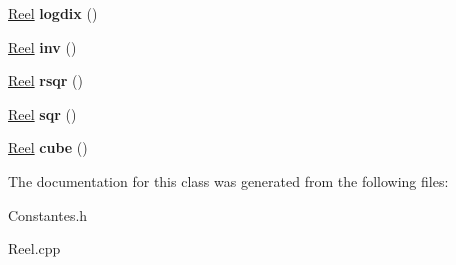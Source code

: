 \begin{DoxyCompactItemize}
\item 
\hypertarget{class_calcul_1_1_reel_ad0ce58a3af4dda52ef15463978220ab0}{\hyperlink{class_calcul_1_1_reel}{Reel} {\bfseries logdix} ()}\label{class_calcul_1_1_reel_ad0ce58a3af4dda52ef15463978220ab0}

\item 
\hypertarget{class_calcul_1_1_reel_ad7c91c30fd82bfd62748cf7c0b6f6e7b}{\hyperlink{class_calcul_1_1_reel}{Reel} {\bfseries inv} ()}\label{class_calcul_1_1_reel_ad7c91c30fd82bfd62748cf7c0b6f6e7b}

\item 
\hypertarget{class_calcul_1_1_reel_a670ddda82e6d1e3cb95ef69e9cd1a11d}{\hyperlink{class_calcul_1_1_reel}{Reel} {\bfseries rsqr} ()}\label{class_calcul_1_1_reel_a670ddda82e6d1e3cb95ef69e9cd1a11d}

\item 
\hypertarget{class_calcul_1_1_reel_ae6d0c9ed443c23647efee077d5b3bcfd}{\hyperlink{class_calcul_1_1_reel}{Reel} {\bfseries sqr} ()}\label{class_calcul_1_1_reel_ae6d0c9ed443c23647efee077d5b3bcfd}

\item 
\hypertarget{class_calcul_1_1_reel_a9464cfe2dc6a89ff1eb98f504b200f43}{\hyperlink{class_calcul_1_1_reel}{Reel} {\bfseries cube} ()}\label{class_calcul_1_1_reel_a9464cfe2dc6a89ff1eb98f504b200f43}

\end{DoxyCompactItemize}


The documentation for this class was generated from the following files\-:\begin{DoxyCompactItemize}
\item 
Constantes.\-h\item 
Reel.\-cpp\end{DoxyCompactItemize}
